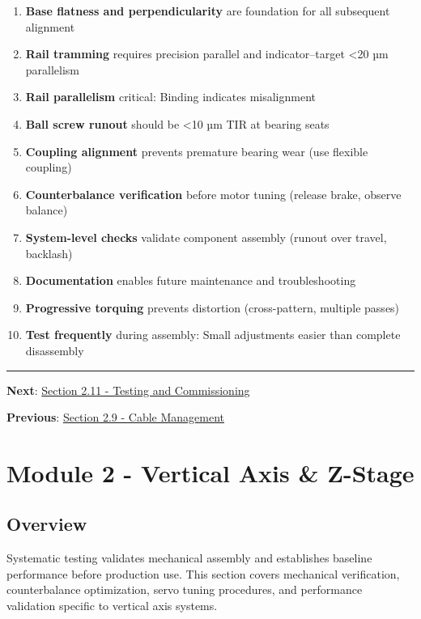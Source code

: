 \documentclass[
]{article}
\providecommand{\tightlist}{%
  \setlength{\itemsep}{0pt}\setlength{\parskip}{0pt}}
\begin{document}
\begin{enumerate}
\def\labelenumi{\arabic{enumi}.}
\tightlist
\item
  \textbf{Base flatness and perpendicularity} are foundation for all
  subsequent alignment
\item
  \textbf{Rail tramming} requires precision parallel and
  indicator--target \textless20 µm parallelism
\item
  \textbf{Rail parallelism} critical: Binding indicates misalignment
\item
  \textbf{Ball screw runout} should be \textless10 µm TIR at bearing
  seats
\item
  \textbf{Coupling alignment} prevents premature bearing wear (use
  flexible coupling)
\item
  \textbf{Counterbalance verification} before motor tuning (release
  brake, observe balance)
\item
  \textbf{System-level checks} validate component assembly (runout over
  travel, backlash)
\item
  \textbf{Documentation} enables future maintenance and troubleshooting
\item
  \textbf{Progressive torquing} prevents distortion (cross-pattern,
  multiple passes)
\item
  \textbf{Test frequently} during assembly: Small adjustments easier
  than complete disassembly
\end{enumerate}

\begin{center}\rule{0.5\linewidth}{0.5pt}\end{center}

\textbf{Next}: \href{section-2.11-testing-commissioning.md}{Section 2.11
- Testing and Commissioning}

\textbf{Previous}: \href{section-2.9-cable-management.md}{Section 2.9 -
Cable Management}

\newpage

\section{Module 2 - Vertical Axis \&
Z-Stage}\label{module-2---vertical-axis-z-stage-1}

\subsection{Overview}\label{overview-1}

Systematic testing validates mechanical assembly and establishes
baseline performance before production use. This section covers
mechanical verification, counterbalance optimization, servo tuning
procedures, and performance validation specific to vertical axis
systems.
\end{document}
